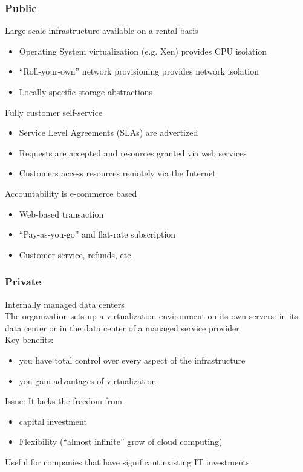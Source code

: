 \documentclass[10pt, oneside]{article}
\begin{document}
\subsubsection{Public}
Large scale infrastructure available on a rental basis\begin{itemize}
    \item Operating System virtualization (e.g. Xen) provides CPU isolation
    \item “Roll-your-own” network provisioning provides network isolation
    \item Locally specific storage abstractions
\end{itemize}
Fully customer self-service\begin{itemize}
    \item Service Level Agreements (SLAs) are advertized
    \item Requests are accepted and resources granted via web services
    \item Customers access resources remotely via the Internet
\end{itemize}
Accountability is e-commerce based\begin{itemize}
    \item Web-based transaction
    \item “Pay-as-you-go” and flat-rate subscription  
    \item Customer service, refunds, etc.
\end{itemize}

\subsubsection{Private}
Internally managed data centers\\
The organization sets up a virtualization environment on its own servers: in its data center or in the data center of a managed service provider\\Key benefits:\begin{itemize}
    \item you have total control over every aspect of the infrastructure
    \item you gain advantages of virtualization
\end{itemize}
Issue: It lacks the freedom from\begin{itemize}
    \item capital investment
    \item Flexibility (“almost infinite” grow of cloud computing)
\end{itemize}Useful for companies that have significant existing IT investments
\end{document}
